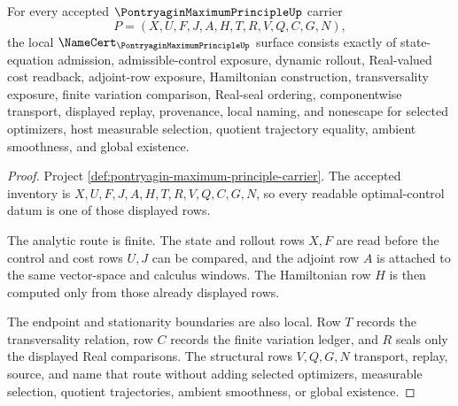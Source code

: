 \begin{theorem}
\label{thm:pontryagin-maximum-principle-namecert-obligations}
For every accepted $\PontryaginMaximumPrincipleUp$ carrier
$$
P=(X,U,F,J,A,H,T,R,V,Q,C,G,N),
$$
the local $\NameCert_{\PontryaginMaximumPrincipleUp}$ surface consists exactly of state-equation admission, admissible-control exposure, dynamic rollout, Real-valued cost readback, adjoint-row exposure, Hamiltonian construction, transversality exposure, finite variation comparison, Real-seal ordering, componentwise transport, displayed replay, provenance, local naming, and nonescape for selected optimizers, host measurable selection, quotient trajectory equality, ambient smoothness, and global existence.
\end{theorem}
\begin{proof}
Project \autoref{def:pontryagin-maximum-principle-carrier}. The accepted inventory is $X,U,F,J,A,H,T,R,V,Q,C,G,N$, so every readable optimal-control datum is one of those displayed rows.

The analytic route is finite. The state and rollout rows $X,F$ are read before the control and cost rows $U,J$ can be compared, and the adjoint row $A$ is attached to the same vector-space and calculus windows. The Hamiltonian row $H$ is then computed only from those already displayed rows.

The endpoint and stationarity boundaries are also local. Row $T$ records the transversality relation, row $C$ records the finite variation ledger, and $R$ seals only the displayed Real comparisons. The structural rows $V,Q,G,N$ transport, replay, source, and name that route without adding selected optimizers, measurable selection, quotient trajectories, ambient smoothness, or global existence.
\end{proof}

